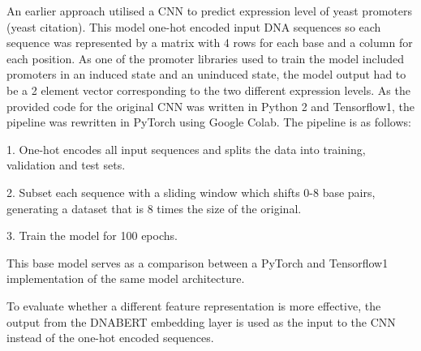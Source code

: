 \documentclass{article}
\begin{document}
An earlier approach utilised a CNN to predict expression level of yeast promoters (yeast citation). This model one-hot encoded input DNA sequences so each sequence was represented by a matrix with 4 rows for each base and a column for each position. As one of the promoter libraries used to train the model included promoters in an induced state and an uninduced state, the model output had to be a 2 element vector corresponding to the two different expression levels. As the provided code for the original CNN was written in Python 2 and Tensorflow1, the pipeline was rewritten in PyTorch using Google Colab. The pipeline is as follows:

1. One-hot encodes all input sequences and splits the data into training, validation and test sets.

2. Subset each sequence with a sliding window which shifts 0-8 base pairs, generating a dataset that is 8 times the size of the original.

3. Train the model for 100 epochs.

This base model serves as a comparison between a PyTorch and Tensorflow1 implementation of the same model architecture.

To evaluate whether a different feature representation is more effective, the output from the DNABERT embedding layer is used as the input to the CNN instead of the one-hot encoded sequences.
\end{document}
